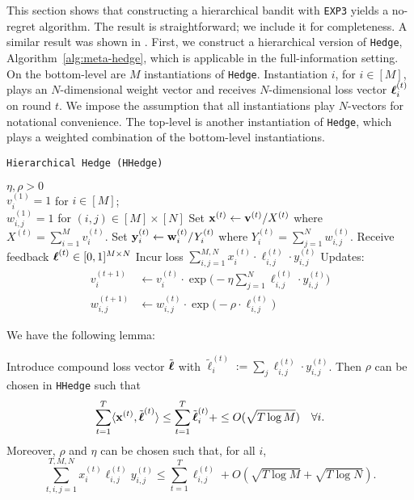 This section shows that constructing a hierarchical bandit with \texttt{EXP3} yields a no-regret algorithm. The result is straightforward; we include it for completeness. A similar result was shown in \cite{chang:05}. 
First, we construct a hierarchical version of \texttt{Hedge}, Algorithm~\ref{alg:meta-hedge}, which is applicable in the full-information setting. On the bottom-level are $M$ instantiations of \texttt{Hedge}. Instantiation $i$, for $i\in[M]$, plays an $N$-dimensional weight vector and receives $N$-dimensional loss vector $\boldsymbol\ell^{(t)}_{i}$ on round $t$. We impose the assumption that all instantiations play $N$-vectors for notational convenience. The top-level is another instantiation of \texttt{Hedge}, which plays a weighted combination of the bottom-level instantiations.

\begin{algorithm}
   \caption{\texttt{Hierarchical Hedge (HHedge)}}
   \label{alg:meta-hedge}
   \begin{algorithmic}   
   	 $\eta,\rho>0$\\
   	 $v^{(1)}_{i}=1$ for $i\in[M]$;\\ 
   	 $w^{(1)}_{i,j}=1$ for $(i,j)\in[M]\times[N]$
	\STATE Set ${\mathbf x}^{(t)} \leftarrow {\mathbf v}^{(t)}/X^{(t)}$ where $X^{(t)} = \sum_{i=1}^M v^{(t)}_{i}$.
	\STATE Set ${\mathbf y}^{(t)}_{i} \leftarrow {\mathbf w}^{(t)}_{i}/Y^{(t)}_{i}$ where $Y^{(t)}_{i} = \sum_{j=1}^N w^{(t)}_{i,j}$.
	\STATE Receive feedback $\boldsymbol\ell^{(t)}\in [0,1]^{M\times N}$ 
	\STATE Incur loss $\sum_{i,j=1}^{M,N} x^{(t)}_{i}\cdot\ell^{(t)}_{i,j}\cdot y^{(t)}_{i,j}$
	\STATE Updates:
	\begin{align}
		v^{(t+1)}_i & \leftarrow v^{(t)}_{i}\cdot \exp\big(-\eta \sum_{j=1}^N\ell^{(t)}_{i,j}\cdot y^{(t)}_{i,j}\big)
		\\
		w^{(t+1)}_{i,j} & \leftarrow w^{(t)}_{i,j}\cdot \exp\big(-\rho\cdot \ell^{(t)}_{i,j}\big)
	\end{align}
   	\ENDFOR
   	\end{algorithmic}
\end{algorithm}

We have the following lemma:

\begin{lem}\label{lem:meta-hedge}
	Introduce compound loss vector $\tilde{\boldsymbol\ell}$ with $\tilde{\ell}^{(t)}_i := \sum_j \ell^{(t)}_{i,j}\cdot y^{(t)}_{i,j}$. Then $\rho$ can be chosen in \texttt{HHedge} such that
	\begin{equation}
		\sum_{t=1}^T \langle {\mathbf x}^{(t)},\tilde{\boldsymbol\ell}^{(t)}\rangle 
		\leq  \sum_{t=1}^T \tilde{\boldsymbol\ell}^{(t)}_i +
		\leq O(\sqrt{T \log M})\quad\forall i.
	\end{equation}
	Moreover, $\rho$ and $\eta$ can be chosen such that, for all $i$,
	\begin{equation}
		\sum_{t,i,j=1}^{T,M,N} x^{(t)}_{i}\ell^{(t)}_{i,j} y^{(t)}_{i,j}
		\leq \sum_{t=1}^T\ell^{(t)}_{i,j}
		+ O(\sqrt{T \log M} + \sqrt{T \log N}).
	\end{equation}
\end{lem}

